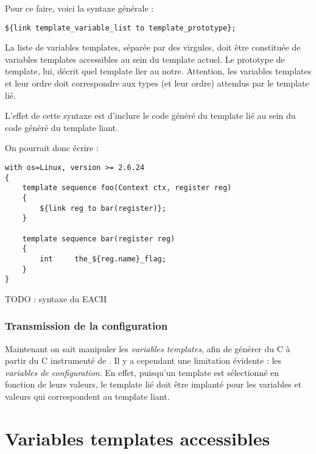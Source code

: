 \documentclass[french]{rtxreport}
\begin{document}
Pour ce faire, voici la syntaxe générale :
\begin{lstlisting}
${link template_variable_list to template_prototype};
\end{lstlisting}

La liste de variables templates, séparée par des virgules, doit être constituée
de variables templates accessibles au sein du template actuel. Le prototype de
template, lui, décrit quel template lier au notre. Attention, les variables
templates et leur ordre doit correspondre aux types (et leur ordre) attendus
par le template lié.

L'effet de cette syntaxe est d'inclure le code généré du template lié au sein
du code généré du template liant.

On pourrait donc écrire :
\begin{lstlisting}
with os=Linux, version >= 2.6.24
{
    template sequence foo(Context ctx, register reg)
    {
        ${link reg to bar(register)};
    }

    template sequence bar(register reg)
    {
        int     the_${reg.name}_flag;
    }
}
\end{lstlisting}


TODO : syntaxe du EACH



\subsection{Transmission de la configuration}

Maintenant on sait manipuler les \emph{variables templates}, afin de générer du
C à partir du C instrumenté de \rtx. Il y a cependant une limitation évidente :
les \emph{variables de configuration}. En effet, puisqu'un template est
sélectionné en fonction de leurs valeurs, le template lié doit être implanté
pour les variables et valeurs qui correspondent au template liant.


\chapter{Variables templates accessibles}
\end{document}

